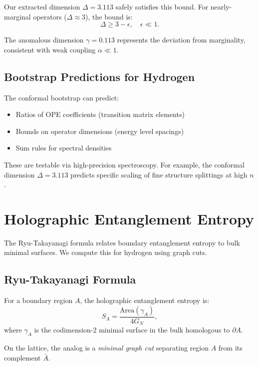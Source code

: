 \documentclass[aps,prd,twocolumn,superscriptaddress,floatfix]{revtex4-2}
\begin{document}
Our extracted dimension $\Delta = 3.113$ safely satisfies this bound. For nearly-marginal operators ($\Delta \approx 3$), the bound is:
\begin{equation}
\Delta \geq 3 - \epsilon, \quad \epsilon \ll 1.
\end{equation}

The anomalous dimension $\gamma = 0.113$ represents the deviation from marginality, consistent with weak coupling $\alpha \ll 1$.

\subsection{Bootstrap Predictions for Hydrogen}

The conformal bootstrap can predict:
\begin{itemize}
\item Ratios of OPE coefficients (transition matrix elements)
\item Bounds on operator dimensions (energy level spacings)
\item Sum rules for spectral densities
\end{itemize}

These are testable via high-precision spectroscopy. For example, the conformal dimension $\Delta = 3.113$ predicts specific scaling of fine structure splittings at high $n$.


\section{Holographic Entanglement Entropy}

The Ryu-Takayanagi formula \cite{ryu2006,hubeny2007} relates boundary entanglement entropy to bulk minimal surfaces. We compute this for hydrogen using graph cuts.

\subsection{Ryu-Takayanagi Formula}

For a boundary region $A$, the holographic entanglement entropy is:
\begin{equation}
S_A = \frac{\text{Area}(\gamma_A)}{4G_N},
\end{equation}
where $\gamma_A$ is the codimension-2 minimal surface in the bulk homologous to $\partial A$.

On the lattice, the analog is a \textit{minimal graph cut} separating region $A$ from its complement $\bar{A}$.
\end{document}

